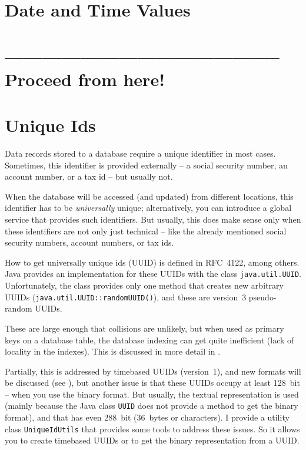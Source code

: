 \documentclass[11pt,a4paper, titlepage, parskip=half, headsepline, footsepline, cleardoublepage=current, headheight=1cm]{scrbook}
\begin{document}
\section{Date and Time Values}\label{sec:DateAndTimeValues}
\section{-------------------------------------------- Proceed from here!}
\lipsum[1]

\section{Unique Ids}\label{sec:UniqueIds}
Data records stored to a database require a unique identifier in most cases. Sometimes, this identifier is provided externally – a social security number, an account number, or a tax id – but usually not. 

When the database will be accessed (and updated) from different locations, this identifier has to be \textit{universally} unique; alternatively, you can introduce a global service that provides such identifiers. But usually, this does make sense only when these identifiers are not only just technical – like the already mentioned social security numbers, account numbers, or tax ids.

How to get universally unique ids (UUID) is defined in RFC~4122\autocite{Leach:RFC4122}, among others. Java provides an implementation for these UUIDs with the class \lstinline|java.util.UUID|\autocite{ORACLE_DOC_UUID_CLASS}. Unfortunately, the class provides only one method that creates new arbitrary UUIDs (\lstinline|java.util.UUID::randomUUID()|\autocite{ORACLE_DOC_UUID:randomUUID}), and these are version~3 pseudo-random UUIDs.

These are large enough that collisions are unlikely, but when used as primary keys on a database table, the database indexing can get quite inefficient (lack of locality in the indexes). This is discussed in more detail in \autocite{Mihalcea:UUID_Database_Primary_Key}.

Partially, this is addressed by timebased UUIDs (version~1), and new formats will be discussed (see \autocite{Davis:NewUUIDs, Leach:RFC4122bis}), but another issue is that these UUIDs occupy at least 128~bit – when you use the binary format. But usually, the textual representation is used (mainly because the Java class \lstinline|UUID| does not provide a method to get the binary format), and that has even 288~bit (36~bytes or characters). I provide a utility class \lstinline|UniqueIdUtils|\autocite{TQUADRAT_ORG_FOUNDATION_UNIQUEIDUTILS} that provides some tools to address these issues. So it allows you to create timebased UUIDs or to get the binary representation from a UUID.
\end{document}
